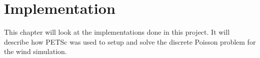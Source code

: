 \chapter{Implementation}

This chapter will look at the implementations done in this project. It will describe 
how PETSc was used to setup and solve the discrete Poisson problem for the wind 
simulation. 


